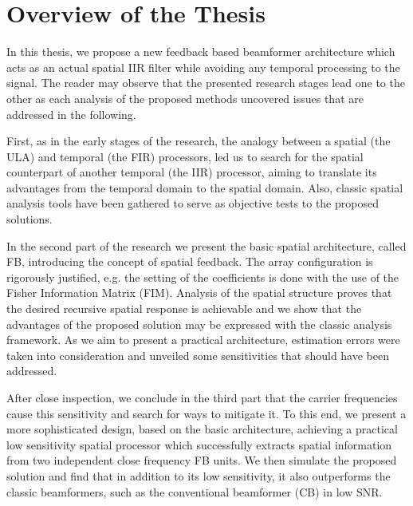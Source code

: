 \section{Overview of the Thesis}
In this thesis, we propose a new feedback based beamformer architecture which acts as an actual spatial IIR filter while avoiding any temporal processing to the signal.
The reader may observe that the presented research stages lead one to the other as each analysis of the proposed methods uncovered issues that are addressed in the following.
\par
First, as in the early stages of the research, the analogy between a spatial (the ULA) and temporal (the FIR) processors, led us to search for the spatial counterpart of another temporal (the IIR) processor, aiming to translate its advantages from the temporal domain to the spatial domain.
Also, classic spatial analysis tools have been gathered to serve as objective tests to the proposed solutions.
\par
In the second part of the research we present the basic spatial architecture, called FB, introducing the concept of spatial feedback.
The array configuration is rigorously justified, e.g. the setting of the coefficients is done with the use of the Fisher Information Matrix (FIM).
Analysis of the spatial structure proves that the desired recursive spatial response is achievable and we show that the advantages of the proposed solution may be expressed with the classic analysis framework.
As we aim to present a practical architecture, estimation errors were taken into consideration and unveiled some sensitivities that should have been addressed.
\par
After close inspection, we conclude in the third part that the carrier frequencies cause this sensitivity and search for ways to mitigate it.
To this end, we present a more sophisticated design, based on the basic architecture, achieving a practical low sensitivity spatial processor which successfully extracts spatial information from two independent close frequency FB units.
We then simulate the proposed solution and find that in addition to its low sensitivity, it also outperforms the classic beamformers, such as the conventional beamformer (CB) in low SNR. 
